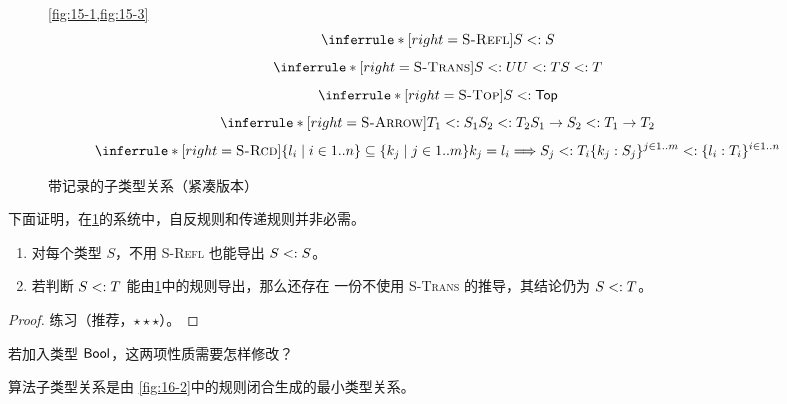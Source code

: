 \begin{figure}[!ht]
\centering
\begin{minipage}{0.98\linewidth}
\small
\taplfigureheader{{\Large \(<:\)}}
  {\cref{fig:15-1,fig:15-3}}
\[
\inferrule*[right=\textsc{S-Refl}]{ }{S\subtype S}
\]
\[
\inferrule*[right=\textsc{S-Trans}]
 {S\subtype U\\U\subtype T}{S\subtype T}
\]
\[
\inferrule*[right=\textsc{S-Top}]{ }{S\subtype\tapltype{Top}}
\]
\[
\inferrule*[right=\textsc{S-Arrow}]
 {T_1\subtype S_1\\S_2\subtype T_2}
 {S_1\to S_2\subtype T_1\to T_2}
\]
\[
\inferrule*[right=\textsc{S-Rcd}]
 {\{l_i\mid i\in1..n\}\subseteq\{k_j\mid j\in1..m\}\\
  k_j=l_i\Longrightarrow S_j\subtype T_i}
 {\{k_j:S_j\}^{j\in1..m}\subtype
  \{l_i:T_i\}^{i\in1..n}}
\]
\end{minipage}
\caption{带记录的子类型关系（紧凑版本）}
\label{fig:16-1}
\end{figure}
\FloatBarrier

下面证明，在\cref{fig:16-1}的系统中，自反规则和传递规则并非必需。

\taplstatementliststart
\begin{lemma}
\label{lem:16.1.2}
\taplstatementlistbreak
\begin{enumerate}
\item 对每个类型 \(S\)，不用 \textsc{S-Refl} 也能导出
  \(S\mathrel{<:} S\)。
\item 若判断 \(S\mathrel{<:} T\) 能由\cref{fig:16-1}中的规则导出，那么还存在
  一份不使用 \textsc{S-Trans} 的推导，其结论仍为 \(S\mathrel{<:} T\)。
\end{enumerate}
\end{lemma}
\begin{proof}
练习（推荐，\(\star\star\star\)）。
\end{proof}

\begin{exercise}[\(\star\)]
\label{ex:16.1.3}
若加入类型 \(\mathsf{Bool}\)，这两项性质需要怎样修改？
\end{exercise}

\begin{definition}
\label{def:16.1.4}
算法子类型关系是由
\cref{fig:16-2}中的规则闭合生成的最小类型关系。
\end{definition}

